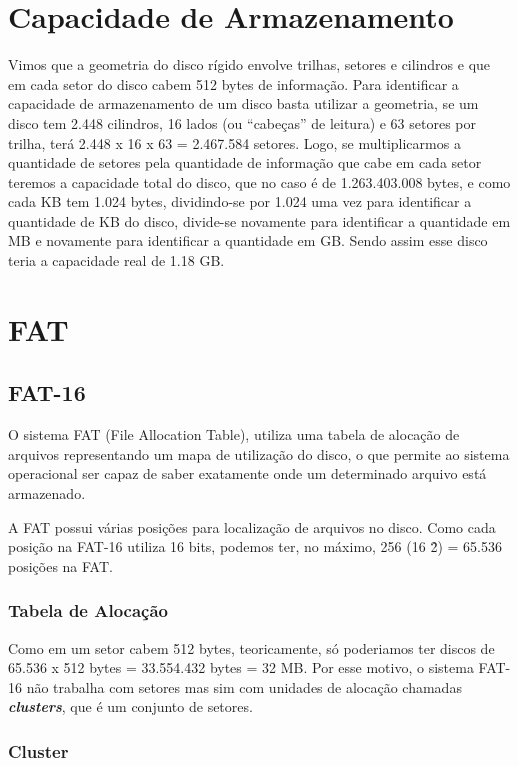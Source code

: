 \chapter{Capacidade de Armazenamento}

Vimos que a geometria do disco rígido envolve trilhas, setores e cilindros e que em cada setor do disco cabem 512 bytes de informação. Para identificar a capacidade de armazenamento de um disco basta utilizar a geometria, se um disco tem 2.448 cilindros, 16 lados (ou ``cabeças'' de leitura) e 63 setores por trilha, terá 2.448 x 16 x 63 = 2.467.584 setores. Logo, se multiplicarmos a quantidade de setores pela quantidade de informação que cabe em cada setor teremos a capacidade total do disco, que no caso é de 1.263.403.008 bytes, e como cada KB tem 1.024 bytes, dividindo-se por 1.024 uma vez para identificar a quantidade de KB do disco, divide-se novamente para identificar a quantidade em MB e novamente para identificar a quantidade em GB. Sendo assim esse disco teria a capacidade real de 1.18 GB.

\chapter{FAT}

\section{FAT-16}

O sistema FAT (File Allocation Table), utiliza uma tabela de alocação de arquivos representando um mapa de utilização do disco, o que permite ao sistema operacional ser capaz de saber exatamente onde um determinado arquivo está armazenado.

A FAT possui várias posições para localização de arquivos no disco. Como cada posição na FAT-16 utiliza 16 bits, podemos ter, no máximo, 256 (16 \^ 2) = 65.536 posições na FAT.

\subsection{Tabela de Alocação}

Como em um setor cabem 512 bytes, teoricamente, só poderiamos ter discos de 65.536 x 512 bytes = 33.554.432 bytes = 32 MB. Por esse motivo, o sistema FAT-16 não trabalha com setores mas sim com unidades de alocação chamadas \emph{\textbf{clusters}}, que é um conjunto de setores.

\subsection{Cluster}

